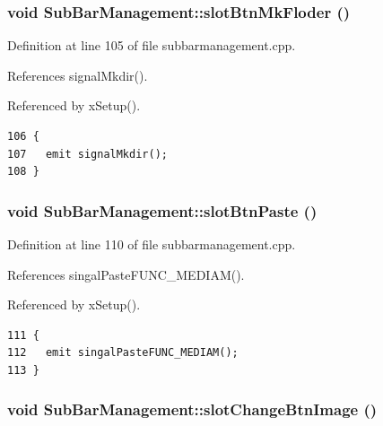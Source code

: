 \subsubsection{\setlength{\rightskip}{0pt plus 5cm}void Sub\-Bar\-Management::slot\-Btn\-Mk\-Floder ()\hspace{0.3cm}{\tt  [slot]}}\label{classSubBarManagement_SubBarManagementi0}




Definition at line 105 of file subbarmanagement.cpp.

References signal\-Mkdir().

Referenced by x\-Setup().



\footnotesize\begin{verbatim}106 {
107   emit signalMkdir();
108 }
\end{verbatim}\normalsize 
{}
\subsubsection{\setlength{\rightskip}{0pt plus 5cm}void Sub\-Bar\-Management::slot\-Btn\-Paste ()\hspace{0.3cm}{\tt  [slot]}}\label{classSubBarManagement_SubBarManagementi1}




Definition at line 110 of file subbarmanagement.cpp.

References singal\-Paste\-FUNC\_\-MEDIAM().

Referenced by x\-Setup().



\footnotesize\begin{verbatim}111 {
112   emit singalPasteFUNC_MEDIAM();
113 }
\end{verbatim}\normalsize 
{}
\subsubsection{\setlength{\rightskip}{0pt plus 5cm}void Sub\-Bar\-Management::slot\-Change\-Btn\-Image ()\hspace{0.3cm}{\tt  [private, slot]}}\label{classSubBarManagement_SubBarManagementk0}




